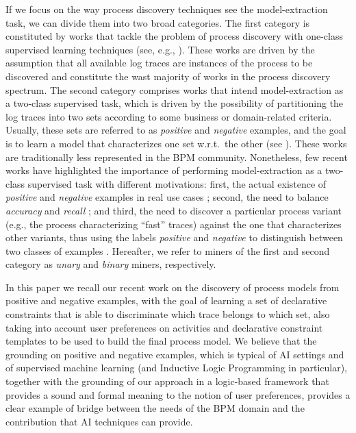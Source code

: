 \documentclass[letterpaper]{article} %
\theoremstyle{definition}
\begin{document}
If we focus on the way process discovery techniques see the model-extraction task, we can divide them into two broad categories. 
The first category is constituted by works that tackle the problem of process discovery with one-class supervised learning techniques (see, e.g., \cite{2010-Aalst,2004-Aalst,2007-Gunther,2003-Weijters,DBLP:conf/bpm/AalstMFG17}). These works are driven by the assumption that all available log traces are instances of the process to be discovered and constitute the wast majority of works in the process discovery spectrum. 
The second category comprises works that intend model-extraction as a two-class supervised task, which is driven by the possibility of partitioning the log traces into two sets according to some business or domain-related criteria. Usually, these sets are referred to as \emph{positive} and \emph{negative} examples, and the goal is to learn a model that characterizes one set w.r.t.\ the other (see \cite{2009-Chesani,2009-Goedertier,2006-Maruster}). These works are traditionally less represented in the BPM community. Nonetheless, few recent works \cite{deviant-tkde,2018-Ponce,DBLP:conf/bpm/SlaatsDB21} have highlighted the importance of performing model-extraction as a two-class supervised task with different motivations: first, the actual existence of \emph{positive} and \emph{negative} examples in real use cases \cite{2018-Ponce,DBLP:conf/bpm/SlaatsDB21}; second, the need to balance \emph{accuracy} and \emph{recall} \cite{DBLP:conf/bpm/SlaatsDB21}; and third, the need to discover a particular process variant (e.g., the process characterizing ``fast'' traces) against the one that characterizes other variants, thus using the labels \emph{positive} and \emph{negative} to distinguish between two classes of examples \cite{deviant-tkde}.  
Hereafter, we refer to miners of the first and second category as \emph{unary} and \emph{binary} miners, respectively. 

In this paper we recall our recent work on the discovery of process models from positive and negative examples, with the goal of learning a set of declarative constraints that is able to discriminate which trace belongs to which set, also taking into account user preferences on activities and declarative constraint templates to be used to build the final process model. We believe that the grounding on positive and negative examples, which is typical of AI settings and of supervised machine learning (and Inductive Logic Programming in particular), together with the grounding of our approach in a logic-based framework that provides a sound and formal meaning to the notion of user preferences, provides a clear example of bridge between the needs of the BPM domain and the contribution that AI techniques can provide.   
\end{document}
